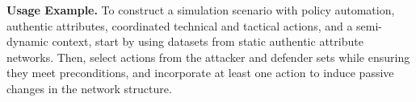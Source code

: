 



\textbf{Usage Example.}
To construct a simulation scenario with policy automation, authentic attributes, coordinated technical and tactical actions, and a semi-dynamic context, start by using datasets from static authentic attribute networks. Then, select actions from the attacker and defender sets while ensuring they meet preconditions, and incorporate at least one action to induce passive changes in the network structure.

